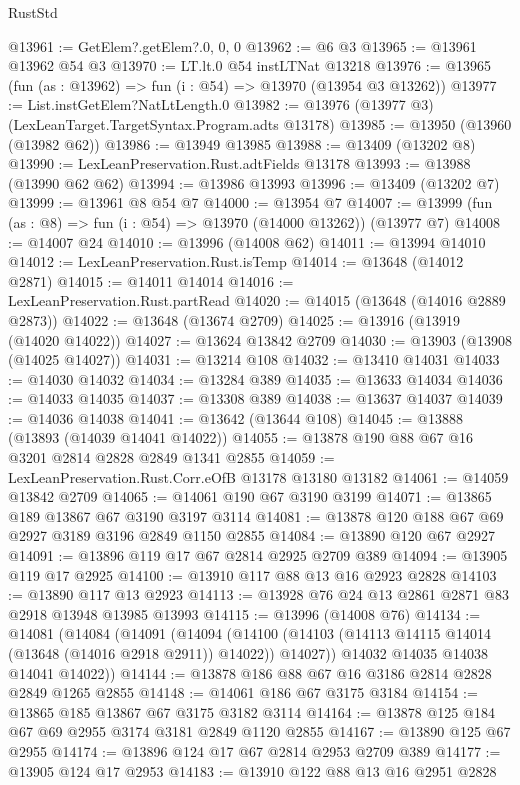 \begin{lexlean}{RustStd}
\begin{coremodule}
@13961 := GetElem?.getElem?.{0, 0, 0}
@13962 := @6 @3
@13965 := @13961 @13962 @54 @3
@13970 := LT.lt.{0} @54 instLTNat @13218
@13976 := @13965 (fun (as : @13962) => fun (i : @54) => @13970 (@13954 @3 @13262))
@13977 := List.instGetElem?NatLtLength.{0}
@13982 := @13976 (@13977 @3) (LexLeanTarget.TargetSyntax.Program.adts @13178)
@13985 := @13950 (@13960 (@13982 @62))
@13986 := @13949 @13985
@13988 := @13409 (@13202 @8)
@13990 := LexLeanPreservation.Rust.adtFields @13178
@13993 := @13988 (@13990 @62 @62)
@13994 := @13986 @13993
@13996 := @13409 (@13202 @7)
@13999 := @13961 @8 @54 @7
@14000 := @13954 @7
@14007 := @13999 (fun (as : @8) => fun (i : @54) => @13970 (@14000 @13262)) (@13977 @7)
@14008 := @14007 @24
@14010 := @13996 (@14008 @62)
@14011 := @13994 @14010
@14012 := LexLeanPreservation.Rust.isTemp
@14014 := @13648 (@14012 @2871)
@14015 := @14011 @14014
@14016 := LexLeanPreservation.Rust.partRead
@14020 := @14015 (@13648 (@14016 @2889 @2873))
@14022 := @13648 (@13674 @2709)
@14025 := @13916 (@13919 (@14020 @14022))
@14027 := @13624 @13842 @2709
@14030 := @13903 (@13908 (@14025 @14027))
@14031 := @13214 @108
@14032 := @13410 @14031
@14033 := @14030 @14032
@14034 := @13284 @389
@14035 := @13633 @14034
@14036 := @14033 @14035
@14037 := @13308 @389
@14038 := @13637 @14037
@14039 := @14036 @14038
@14041 := @13642 (@13644 @108)
@14045 := @13888 (@13893 (@14039 @14041 @14022))
@14055 := @13878 @190 @88 @67 @16 @3201 @2814 @2828 @2849 @1341 @2855
@14059 := LexLeanPreservation.Rust.Corr.eOfB @13178 @13180 @13182
@14061 := @14059 @13842 @2709
@14065 := @14061 @190 @67 @3190 @3199
@14071 := @13865 @189 @13867 @67 @3190 @3197 @3114
@14081 := @13878 @120 @188 @67 @69 @2927 @3189 @3196 @2849 @1150 @2855
@14084 := @13890 @120 @67 @2927
@14091 := @13896 @119 @17 @67 @2814 @2925 @2709 @389
@14094 := @13905 @119 @17 @2925
@14100 := @13910 @117 @88 @13 @16 @2923 @2828
@14103 := @13890 @117 @13 @2923
@14113 := @13928 @76 @24 @13 @2861 @2871 @83 @2918 @13948 @13985 @13993
@14115 := @13996 (@14008 @76)
@14134 := @14081
    (@14084
      (@14091
        (@14094
          (@14100 (@14103 (@14113 @14115 @14014 (@13648 (@14016 @2918 @2911)) @14022)) @14027))
        @14032
        @14035
        @14038
        @14041
        @14022))
@14144 := @13878 @186 @88 @67 @16 @3186 @2814 @2828 @2849 @1265 @2855
@14148 := @14061 @186 @67 @3175 @3184
@14154 := @13865 @185 @13867 @67 @3175 @3182 @3114
@14164 := @13878 @125 @184 @67 @69 @2955 @3174 @3181 @2849 @1120 @2855
@14167 := @13890 @125 @67 @2955
@14174 := @13896 @124 @17 @67 @2814 @2953 @2709 @389
@14177 := @13905 @124 @17 @2953
@14183 := @13910 @122 @88 @13 @16 @2951 @2828

\end{coremodule}
\end{lexlean}
